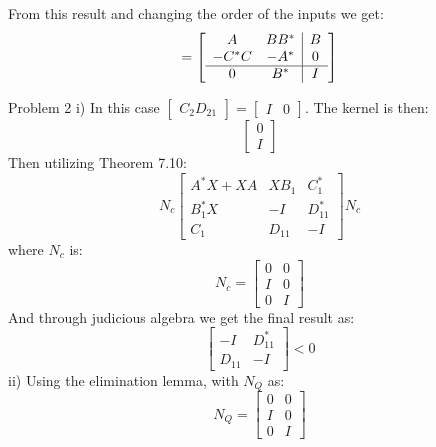 \documentclass{article}
\begin{document}
From this result and changing the order of the inputs we get:
\begin{equation}
    [I - G^{\sim}(s)G(s)] = \left[ \begin{array}{cc | c}
                           A & BB^{*} & B \\
                           -C^{*}C & -A^{*} & 0 \\
                           \hline
                           0 & B^{*} & I\\
                           \end{array} \right]
\end{equation}

\noindent
{\large Problem 2}
\newline
\newline
i) In this case $\begin{bmatrix} C_2 D_{21} \end{bmatrix} = \begin{bmatrix} I & 0 \end{bmatrix}$. The kernel is then:
\begin{equation} \begin{bmatrix} 0 \\ I \end{bmatrix} \end{equation}
Then utilizing Theorem 7.10:
\begin{equation}
    N_c\begin{bmatrix} A^{*}X + XA & XB_1 & C_1^* \\
                       B_1^*X & -I & D_{11}^* \\
                       C_1 & D_{11} & -I
       \end{bmatrix}N_c
\end{equation}
where $N_c$ is:
\begin{equation}
    N_c = \begin{bmatrix} 0 & 0 \\ I & 0 \\ 0 & I \end{bmatrix}
\end{equation}
And through judicious algebra we get the final result as:
\begin{equation}
    \begin{bmatrix} -I & D_{11}^* \\ D_{11} & -I \end{bmatrix} < 0
\end{equation}
ii) Using the elimination lemma, with $N_Q$ as:
\begin{equation}
    N_Q = \begin{bmatrix} 0 & 0 \\ I & 0 \\ 0 & I \end{bmatrix}
\end{equation}
\end{document}
